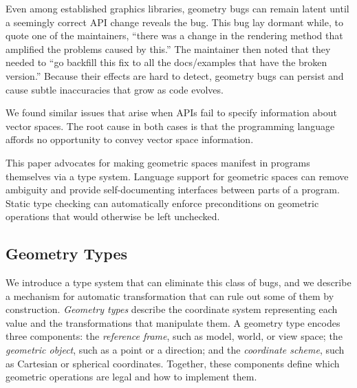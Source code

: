 \documentclass[../main.tex]{subfiles}
\begin{document}
	Even among established graphics libraries, geometry bugs can remain latent until a seemingly correct API change reveals the bug.
	This bug lay dormant while, to quote one of the maintainers, ``there was a change in the rendering method that amplified the problems caused by this.'' The maintainer then noted that they needed to ``go backfill this fix to all the docs/examples that have the broken version.''
	Because their effects are hard to detect, geometry bugs can persist and cause subtle inaccuracies that grow as code evolves.
	
	We found similar issues that arise when APIs fail to specify information about vector spaces.
	The root cause in both cases is that the programming language affords no opportunity to convey vector space information.
	
	This paper advocates for making geometric spaces manifest in programs themselves via a type system.
	Language support for geometric spaces can remove ambiguity and provide self-documenting interfaces between parts of a program.
	Static type checking can automatically enforce preconditions on geometric operations that would otherwise be left unchecked.
	
	
	\subsection{Geometry Types}
	
	We introduce a type system that can eliminate this class of bugs, and we describe a mechanism for automatic transformation that can rule out some of them by construction.
	\emph{Geometry types} describe the coordinate system representing each value and the transformations that manipulate them.
	A geometry type encodes three components:
	the \emph{reference frame}, such as model, world, or view space;
	the \emph{geometric object}, such as a point or a direction;
	and the \emph{coordinate scheme}, such as Cartesian or spherical coordinates.
	Together, these components define which geometric operations are legal and how to implement them.
	
\end{document}
